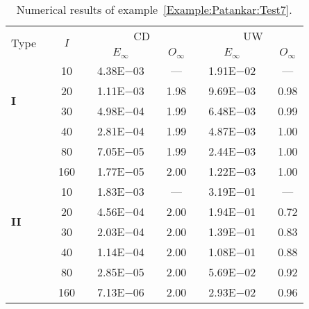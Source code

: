 {\renewcommand{\baselinestretch}{1.0}
\begin{table}[H]
\caption{Numerical results of example~\ref{Example:Patankar:Test7}.}

\setlength{\tabcolsep}{5pt}
\centering
\begin{tabular}{@{}l c c c c c c c c c c@{}}
\toprule
\multirow{2}{*}{Type} &  & \multirow{2}{*}{$I$} &  & \multicolumn{3}{c}{CD} &  & \multicolumn{3}{c}{UW} \\
\cline{5-7}
\cline{9-11}
 & & & & $E_{\infty}$ & & $O_{\infty}$ & & $E_{\infty}$ & & $O_{\infty}$\\
\midrule
\multirow{4}{*}{\textbf{I}} 
 & & 10 & & 4.38E$-$03 & & --- & & 1.91E$-$02 & & ---\\
 & & 20 & & 1.11E$-$03 & & 1.98 & & 9.69E$-$03 & & 0.98\\
 & & 30 & & 4.98E$-$04 & & 1.99 & & 6.48E$-$03 & & 0.99\\
 & & 40 & & 2.81E$-$04 & & 1.99 & & 4.87E$-$03 & & 1.00\\
 & & 80 & & 7.05E$-$05 & & 1.99 & & 2.44E$-$03 & & 1.00\\
 & & 160 & & 1.77E$-$05 & & 2.00 & & 1.22E$-$03 & & 1.00\\
\midrule
\multirow{4}{*}{\textbf{II}} 
 & & 10 & & 1.83E$-$03 & & --- & & 3.19E$-$01 & & ---\\
 & & 20 & & 4.56E$-$04 & & 2.00 & & 1.94E$-$01 & & 0.72\\
 & & 30 & & 2.03E$-$04 & & 2.00 & & 1.39E$-$01 & & 0.83\\
 & & 40 & & 1.14E$-$04 & & 2.00 & & 1.08E$-$01 & & 0.88\\
 & & 80 & & 2.85E$-$05 & & 2.00 & & 5.69E$-$02 & & 0.92\\
 & & 160 & & 7.13E$-$06 & & 2.00 & & 2.93E$-$02 & & 0.96\\
\bottomrule
\end{tabular}
\label{Table:Patankar:Test7}
\end{table}}
